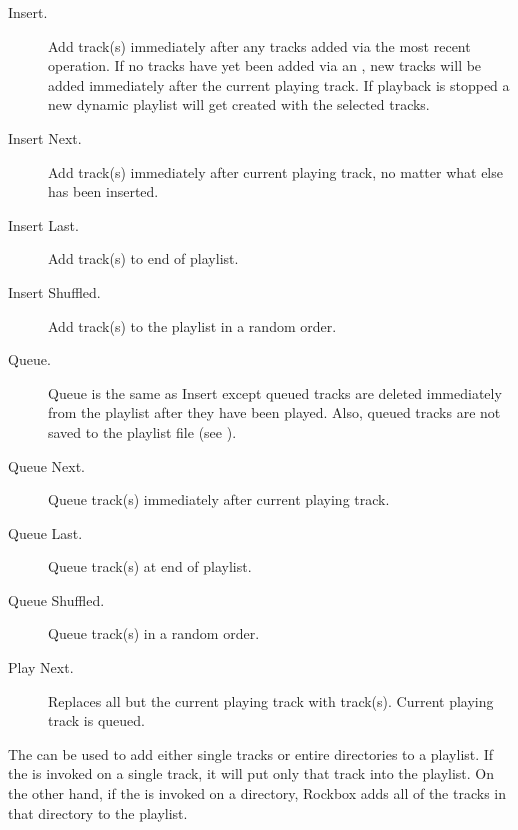 \begin{description} 
\item [Insert.] Add track(s) immediately after any tracks added via the most
  recent  operation. If no tracks have yet been added via an
  , new tracks will be added immediately after the current
  playing track. If playback is stopped a new dynamic playlist will get
  created with the selected tracks.
  
\item [Insert Next.] Add track(s) immediately after current playing
  track, no matter what else has been inserted.
  
\item [Insert Last.] Add track(s) to end of playlist.

\item [Insert Shuffled.] Add track(s) to the playlist in a random order.
  
\item [Queue.] Queue is the same as Insert except queued tracks are
  deleted immediately from the playlist after they have been played. Also,
  queued tracks are not saved to the playlist file (see
  ).
  
\item [Queue Next.] Queue track(s) immediately after current playing track.
  
\item [Queue Last.] Queue track(s) at end of playlist.

\item [Queue Shuffled.] Queue track(s) in a random order.

\item [Play Next.] Replaces all but the current playing track with track(s).
    Current playing track is queued.
\end{description}

The   can be used to add either single tracks or
entire directories to a playlist. If the  is
invoked on a single track, it will put only that track into the playlist.
On the other hand, if the  is invoked on a
directory, Rockbox adds all of the tracks in that directory to the
playlist.


